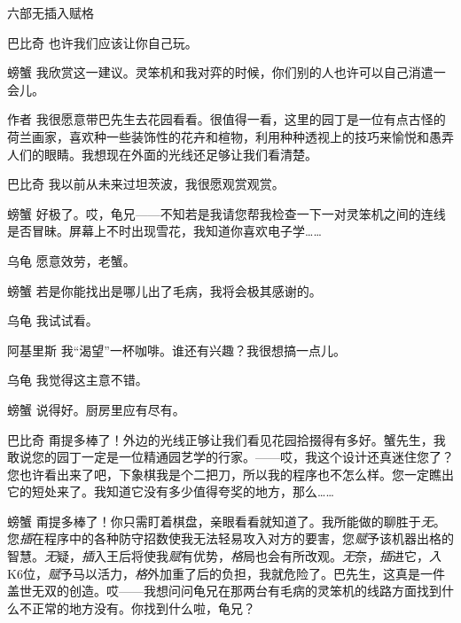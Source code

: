 \begin{dialog}{六部无插入赋格}
\begin{dialogue}
\item[巴比奇]也许我们应该让你自己玩。

\item[螃蟹]我欣赏这一建议。灵笨机和我对弈的时候，你们别的人也许可以自己消遣一会儿。

\item[作者]我很愿意带巴先生去花园看看。很值得一看，这里的园丁是一位有点古怪的荷兰画家，喜欢种一些装饰性的花卉和楦物，利用种种透视上的技巧来愉悦和愚弄人们的眼睛。我想现在外面的光线还足够让我们看清楚。

\item[巴比奇]我以前从未来过坦茨波，我很愿观赏观赏。

\item[螃蟹]好极了。哎，龟兄——不知若是我请您帮我检查一下一对灵笨机之间的连线是否冒昧。屏幕上不时出现雪花，我知道你喜欢电子学……

\item[乌龟]愿意效劳，老蟹。

\item[螃蟹]若是你能找出是哪儿出了毛病，我将会极其感谢的。

\item[乌龟]我试试看。

\item[阿基里斯]我“渴望”一杯咖啡。谁还有兴趣？我很想搞一点儿。

\item[乌龟]我觉得这主意不错。

\item[螃蟹]说得好。厨房里应有尽有。


\item[巴比奇]甭提多棒了！外边的光线正够让我们看见花园拾掇得有多好。蟹先生，我敢说您的园丁一定是一位精通园艺学的行家。——哎，我这个设计还真迷住您了？您也许看出来了吧，下象棋我是个二把刀，所以我的程序也不怎么样。您一定瞧出它的短处来了。我知道它没有多少值得夸奖的地方，那么……

\item[螃蟹]甭提多棒了！你只需盯着棋盘，亲眼看看就知道了。我所能做的聊胜于\emph{无}。您\emph{插}在程序中的各种防守招数使我无法轻易攻入对方的要害，您\emph{赋}予该机器出格的智慧。\emph{无}疑，\emph{插}入王后将使我\emph{赋}有优势，\emph{格}局也会有所改观。\emph{无}奈，\emph{插}进它，\emph{入}K6位，\emph{赋}予马以活力，\emph{格}外加重了后的负担，我就危险了。巴先生，这真是一件盖世无双的创造。哎——我想问问龟兄在那两台有毛病的灵笨机的线路方面找到什么不正常的地方没有。你找到什么啦，龟兄？


\end{dialogue}
\end{dialog}

